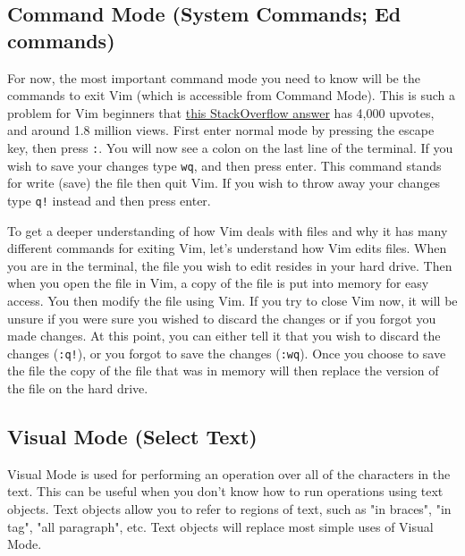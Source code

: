 \documentclass[11pt]{article}
\begin{document}
\subsection{Command Mode (System Commands; Ed commands)}
\label{sec:org1b91364}
For now, the most important command mode you need to know will be the commands
to exit Vim (which is accessible from Command Mode). This is such a problem for
Vim beginners that \href{https://stackoverflow.com/questions/11828270/how-to-exit-the-vim-editor}{this StackOverflow answer} has 4,000 upvotes, and around 1.8
million views. First enter normal mode by pressing the escape key, then press
\texttt{:}. You will now see a colon on the last line of the terminal. If you wish to
save your changes type \texttt{wq}, and then press enter. This command stands for write
(save) the file then quit Vim. If you wish to throw away your changes type \texttt{q!}
instead and then press enter.

To get a deeper understanding of how Vim deals with files and why it has many
different commands for exiting Vim, let's understand how Vim edits files. When
you are in the terminal, the file you wish to edit resides in your hard drive.
Then when you open the file in Vim, a copy of the file is put into memory for
easy access. You then modify the file using Vim. If you try to close Vim now, it
will be unsure if you were sure you wished to discard the changes or if you
forgot you made changes. At this point, you can either tell it that you wish to
discard the changes (\texttt{:q!}), or you forgot to save the changes (\texttt{:wq}). Once you
choose to save the file the copy of the file that was in memory will then
replace the version of the file on the hard drive.
\subsection{Visual Mode (Select Text)}
\label{sec:org4723767}
Visual Mode is used for performing an operation over all of the characters in
the text. This can be useful when you don't know how to run operations using
text objects. Text objects allow you to refer to regions of text, such as "in
braces", "in tag", "all paragraph", etc. Text objects will replace most simple
uses of Visual Mode.
\end{document}
